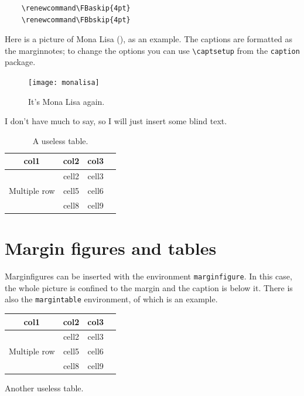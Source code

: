 \begin{verbatim}
	\renewcommand\FBaskip{4pt}
	\renewcommand\FBbskip{4pt}
\end{verbatim}

Here is a picture of Mona Lisa (), as an example. 
The captions are formatted as the marginnotes; to change the options you 
can use \verb|\captsetup| from the \verb|caption| package.

\begin{figure}[h]
	\texttt{[image: monalisa]}
	\caption[Mona Lisa, again]{It's Mona Lisa again. \blindtext}
\end{figure}

I don't have much to say, so I will just insert some blind text. 
\blindtext

\begin{table}
\begin{tabular}{ |c|c|c|c| } 
\hline
col1 & col2 & col3 \\
\hline
\multirow{3}{4em}{Multiple row} & cell2 & cell3 \\ 
& cell5 & cell6 \\ 
& cell8 & cell9 \\ 
\hline
\end{tabular}
\caption[A useless table]{A useless table.}
\end{table}

\blindtext

\section{Margin figures and tables}

Marginfigures can be inserted with the environment \verb|marginfigure|. 
In this case, the whole picture is confined to the margin and the 
caption is below it. There is also the \verb|margintable| environment, 
of which  is an example.

\begin{margintable}
\raggedright
\begin{tabular}{ |c|c|c|c| } 
\hline
col1 & col2 & col3 \\
\hline
\multirow{3}{4em}{Multiple row} & cell2 & cell3 \\ 
& cell5 & cell6 \\ 
& cell8 & cell9 \\ 
\hline
\end{tabular}
\caption[Another useless table]{Another useless table.}
\end{margintable}

